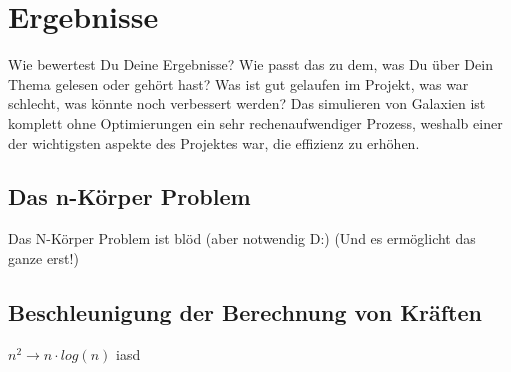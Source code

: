\section{Ergebnisse}
Wie bewertest Du Deine Ergebnisse? Wie passt das zu dem, was Du über Dein Thema
gelesen oder gehört hast? Was ist gut gelaufen im Projekt, was war schlecht,
was könnte noch verbessert werden?  Das simulieren von Galaxien ist komplett
ohne Optimierungen ein sehr rechenaufwendiger Prozess, weshalb einer der
wichtigsten aspekte des Projektes war, die effizienz zu erhöhen.

\subsection{Das n-Körper Problem}
Das N-Körper Problem ist blöd (aber notwendig D:) (Und es ermöglicht das ganze
erst!)

\subsection{Beschleunigung der Berechnung von Kräften}
\( n^2 \rightarrow n \cdot log(n) \)
iasd

